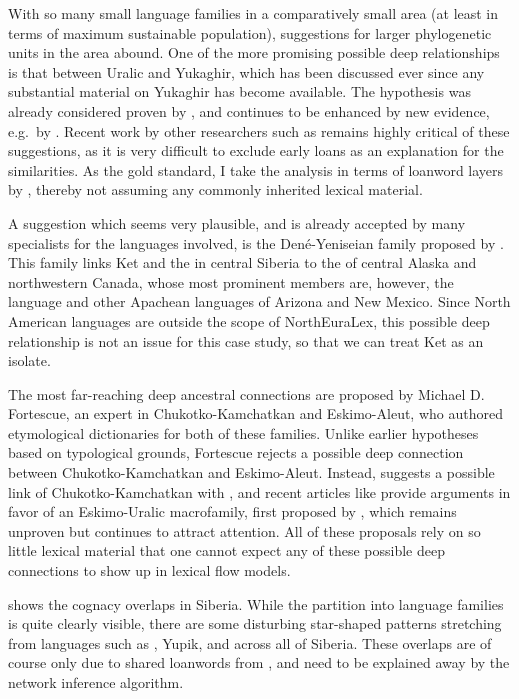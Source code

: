 With so many small language families in a comparatively small area (at least in terms of maximum sustainable population), suggestions for larger phylogenetic units in the area abound. One of the more promising possible deep relationships is that between Uralic and Yukaghir, which has been discussed ever since any substantial material on Yukaghir has become available. The hypothesis was already considered proven by \cite{collinder1940}, and continues to be enhanced by new evidence, e.g.\ by \cite{piispanen2013}. Recent work by other researchers such as \cite{aikio2014} remains highly critical of these suggestions, as it is very difficult to exclude early loans as an explanation for the similarities. As the gold standard, I take the analysis in terms of loanword layers by \cite{hakkinen2012}, thereby not assuming any commonly inherited lexical material.

A suggestion which seems very plausible, and is already accepted by many specialists for the languages involved, is the Den\'{e}-Yeniseian family proposed by \cite{vajda2010}. This family links Ket and the  in central Siberia to the  of central Alaska and northwestern Canada, whose most prominent members are, however, the  language and other Apachean languages of Arizona and New Mexico. Since North American languages are outside the scope of NorthEuraLex, this possible deep relationship is not an issue for this case study, so that we can treat Ket as an isolate.

The most far-reaching deep ancestral connections are proposed by Michael D. Fortescue, an expert in Chukotko-Kamchatkan and Eskimo-Aleut, who authored etymological dictionaries for both of these families. Unlike earlier hypotheses based on typological grounds, Fortescue rejects a possible deep connection between Chukotko-Kamchatkan and Eskimo-Aleut. Instead, \cite{fortescue2011} suggests a possible link of Chukotko-Kamchatkan with , and recent articles like \cite{fortescue2016} provide arguments in favor of an Eskimo-Uralic macrofamily, first proposed by \cite{bergsland1959}, which remains unproven but continues to attract attention. All of these proposals rely on so little lexical material that one cannot expect any of these possible deep connections to show up in lexical flow models.

 shows the cognacy overlaps in Siberia. While the partition into language families is quite clearly visible, there are some disturbing star-shaped patterns stretching from languages such as , Yupik, and  across all of Siberia. These overlaps are of course only due to shared loanwords from , and need to be explained away by the network inference algorithm.

